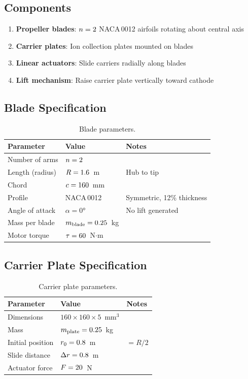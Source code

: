 \documentclass[11pt,a4paper]{article}
\begin{document}
\subsection{Components}

\begin{enumerate}[nosep]
  \item \textbf{Propeller blades}: $n = 2$ NACA\,0012 airfoils rotating about central axis
  \item \textbf{Carrier plates}: Ion collection plates mounted on blades
  \item \textbf{Linear actuators}: Slide carriers radially along blades
  \item \textbf{Lift mechanism}: Raise carrier plate vertically toward cathode
\end{enumerate}

\subsection{Blade Specification}

\begin{table}[H]
\centering
\caption{Blade parameters.}
\begin{tabular}{lll}
\toprule
Parameter & Value & Notes \\
\midrule
Number of arms & $n = 2$ & \\
Length (radius) & $R = 1.6$~m & Hub to tip \\
Chord & $c = 160$~mm & \\
Profile & NACA\,0012 & Symmetric, 12\% thickness \\
Angle of attack & $\alpha = 0°$ & No lift generated \\
Mass per blade & $m_\mathrm{blade} = 0.25$~kg & \\
Motor torque & $\tau = 60$~N$\cdot$m & \\
\bottomrule
\end{tabular}
\end{table}

\subsection{Carrier Plate Specification}

\begin{table}[H]
\centering
\caption{Carrier plate parameters.}
\begin{tabular}{lll}
\toprule
Parameter & Value & Notes \\
\midrule
Dimensions & $160 \times 160 \times 5$~mm$^3$ & \\
Mass & $m_\mathrm{plate} = 0.25$~kg & \\
Initial position & $r_0 = 0.8$~m & $= R/2$ \\
Slide distance & $\Delta r = 0.8$~m & \\
Actuator force & $F = 20$~N & \\
\bottomrule
\end{tabular}
\end{table}
\end{document}
